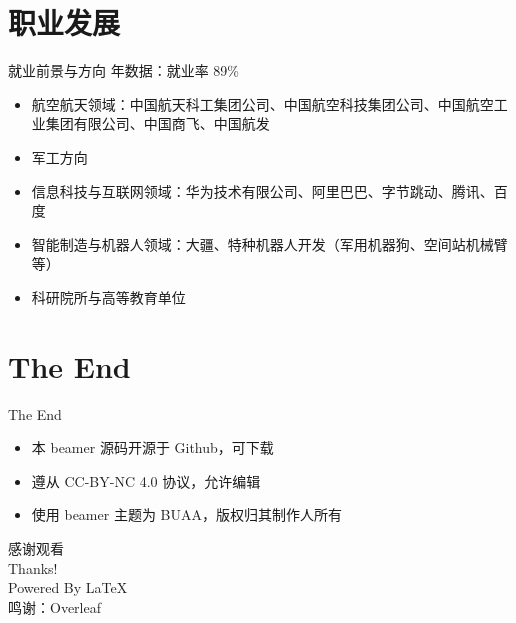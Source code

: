 \documentclass[
    12pt,
    aspectratio=169
]{beamer}
\begin{document}
\section{职业发展}

\begin{frame}{就业前景与方向}
     年数据：就业率 89\%
    \begin{itemize}[<+->]
        \item 航空航天领域：中国航天科工集团公司、‌中国航空科技集团公司、‌中国航空工业集团有限公司、‌中国商飞、中国航发‌
        \item 军工方向
        \item 信息科技与互联网领域‌：华为技术有限公司、阿里巴巴‌、字节跳动、‌腾讯、百度‌
        \item 智能制造与机器人领域‌：大疆、特种机器人开发‌（军用机器狗、空间站机械臂等）
        \item 科研院所与高等教育单位
    \end{itemize}
\end{frame}

\section{The End}

\begin{frame}{The End}
    \begin{itemize}
        \rmfamily
        \item \small 本 beamer 源码开源于 Github，可下载 \\
        \item \small 遵从 CC-BY-NC 4.0 协议，允许编辑 \\
        \item \small 使用 beamer 主题为 BUAA，版权归其制作人所有 \\[0.5cm]
    \end{itemize}
    \begin{center}
        \Huge \srfamily 感谢观看\\
        \huge \rmfamily Thanks!\\[0.5cm] 
        \Large Powered By \LaTeX \\
        \large 鸣谢：Overleaf
    \end{center}
\end{frame}
\end{document}
